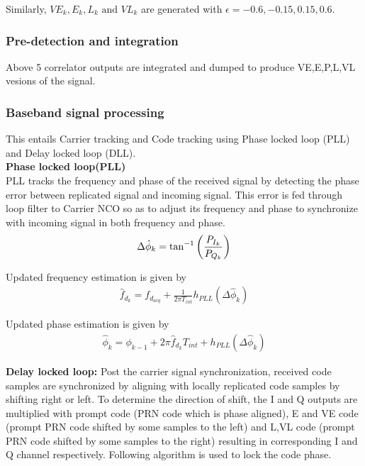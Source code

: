 \documentclass[conference]{IEEEtran}
\begin{document}
Similarly, $VE_k, E_k, L_k \text{ and } VL_k$ are generated with $\epsilon = -0.6, -0.15, 0.15, 0.6$.

\subsubsection{Pre-detection and integration}
Above 5 correlator outputs are integrated and dumped to produce VE,E,P,L,VL vesions of the signal.
\subsubsection{Baseband signal processing}
This entails Carrier tracking and Code tracking using Phase locked loop (PLL) and Delay locked loop (DLL). \\

\noindent\textbf{Phase locked loop(PLL)}\\
PLL tracks the frequency and phase of 
the received signal by detecting the phase error between replicated signal and incoming signal. 
This error is fed through loop filter to Carrier NCO so as to adjust its frequency and phase to 
synchronize with incoming signal in both frequency and phase.  
\begin{align}
  \Delta \hat{\phi}_k = \tan^{-1}\left(\frac{P_{I_{k}}}{P_{Q_{k}}}\right)
\end{align}

\noindent Updated frequency estimation is given by
\begin{align}
	\hat{f}_{d_{k}} = f_{d_{acq}} + \frac{1}{2\pi T_{int}}h_{PLL}(\Delta \hat{\phi}_k)
\end{align}

\noindent Updated phase estimation is given by
\begin{align}
	\hat{\phi}_k = \phi_{k-1} + 2\pi \hat{f}_{d_{k}}T_{int} + h_{PLL}(\Delta \hat{\phi}_k)
\end{align}

\noindent\textbf{Delay locked loop:}
Post the carrier signal synchronization, received code samples are synchronized by aligning 
with locally replicated code samples by shifting right or left. To determine the direction of shift, 
the I and Q outputs are multiplied with prompt code (PRN code which is phase aligned), 
E and VE code (prompt PRN code shifted by some samples to the left) and L,VL code (prompt PRN code 
shifted by some samples to the right) resulting in corresponding I and Q channel respectively. 
Following algorithm is used to lock the code phase.
\end{document}
